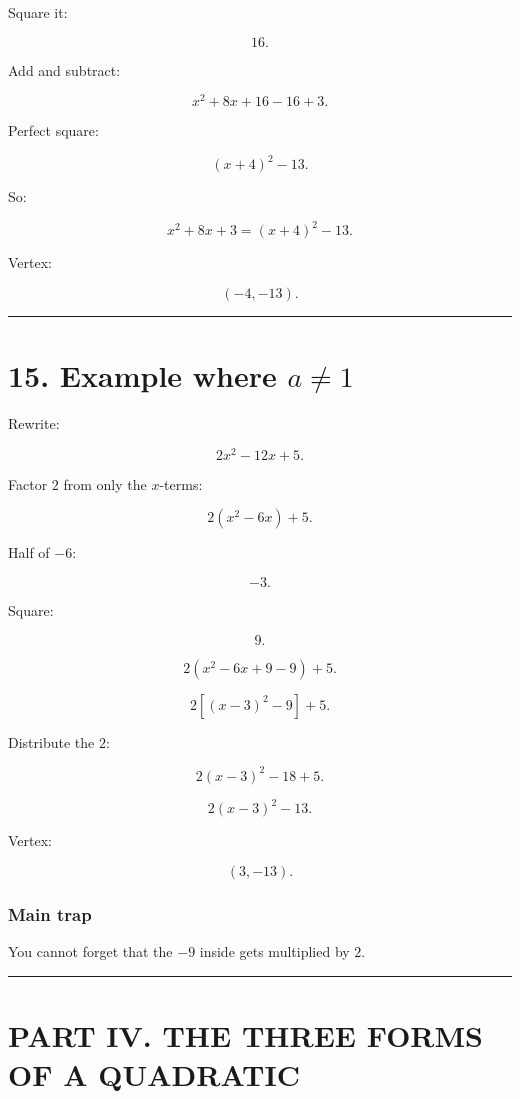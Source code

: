 \documentclass[
]{article}
\begin{document}
Square it:

\[
16.
\]

Add and subtract:

\[
x^2+8x+16-16+3.
\]

Perfect square:

\[
(x+4)^2-13.
\]

So:

\[
\boxed{x^2+8x+3=(x+4)^2-13}.
\]

Vertex:

\[
\boxed{(-4,-13)}.
\]

\begin{center}\rule{0.5\linewidth}{0.5pt}\end{center}

\section{\texorpdfstring{15. Example where
\(a\neq1\)}{15. Example where a\textbackslash neq1}}\label{example-where-aneq1}

Rewrite:

\[
2x^2-12x+5.
\]

Factor \(2\) from only the \(x\)-terms:

\[
2(x^2-6x)+5.
\]

Half of \(-6\):

\[
-3.
\]

Square:

\[
9.
\]

\[
2(x^2-6x+9-9)+5.
\]

\[
2[(x-3)^2-9]+5.
\]

Distribute the \(2\):

\[
2(x-3)^2-18+5.
\]

\[
\boxed{2(x-3)^2-13}.
\]

Vertex:

\[
(3,-13).
\]

\subsubsection{Main trap}\label{main-trap}

You cannot forget that the \(-9\) inside gets multiplied by \(2\).

\begin{center}\rule{0.5\linewidth}{0.5pt}\end{center}

\section{PART IV. THE THREE FORMS OF A
QUADRATIC}\label{part-iv.-the-three-forms-of-a-quadratic}
\end{document}
